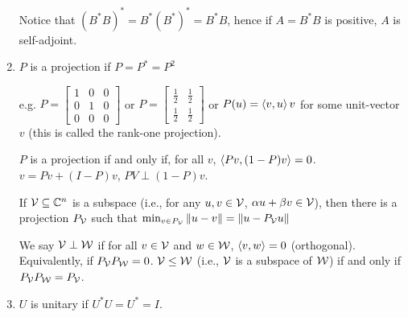 \begin{enumerate}[label=\arabic*.]
          Notice that $(B^*B)^* = B^*(B^*)^* = B^*B$, hence if $A = B^*B$ is positive,
          $A$ is self-adjoint.
    \item $P$ is a projection if $P = P^* = P^2$

          e.g. $P = \begin{bmatrix}1&0&0\\0&1&0\\0&0&0\end{bmatrix}$ or
          $P = \begin{bmatrix}\frac{1}{2} & \frac{1}{2}\\\frac{1}{2}&\frac{1}{2}\end{bmatrix}$
          or $P(u) = \left\langle v, u\right\rangle v$ for some unit-vector $v$ (this is called
          the rank-one projection).

          $P$ is a projection if and only if, for all $v$, $\left\langle Pv, (1-P)v\right\rangle = 0$.
          $v = Pv + (I - P)v$, $PV \perp (1 - P)v$.

          If $\mathcal{V} \subseteq \mathbb{C}^n$ is a subspace (i.e., for any $u, v\in\mathcal{V}$, $\alpha u + \beta v\in \mathcal{V}$), then there is a
          projection $P_{\mathcal{V}}$ such that $\min_{v\in P_{\mathcal{V}}}\left\lVert u - v\right\rVert = \left\lVert u - P_{\mathcal{V}}u\right\rVert$

          We say $\mathcal{V} \perp \mathcal{W}$ if for all $v \in \mathcal{V}$
          and $w\in \mathcal{W}$, $\left\langle v, w\right\rangle= 0$ (orthogonal). Equivalently,
          if $P_{\mathcal{V}}P_{\mathcal{W}} = 0$. $\mathcal{V} \leq \mathcal{W}$
          (i.e., $\mathcal{V}$ is a subspace of $\mathcal{W}$) if and only if
          $P_{\mathcal{V}}P_{\mathcal{W}} = P_{\mathcal{V}}$.

    \item $U$ is unitary if $U^*U = U^* = I$.
\end{enumerate}